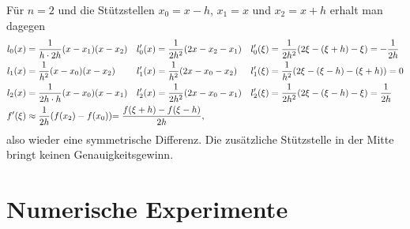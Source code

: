 \begin{refsection}
Für $n=2$ und die Stützstellen $x_0=x-h$, $x_1=x$ und $x_2=x+h$ erhalt man
dagegen
\begin{align*}
l_0(x)
&=
\frac{1}{h\cdot 2h} (x-x_1)(x-x_2)
&
l_0'(x)
&=
\frac{1}{2h^2}(2x-x_2-x_1)
&
l_0'(\xi)
&=
\frac{1}{2h^2}(2\xi -(\xi+h) -\xi)
=
-\frac{1}{2h}
\\
l_1(x)
&=
\frac{1}{h^2} (x-x_0)(x-x_2)
&
l'_1(x)
&=
\frac{1}{h^2} (2x-x_0-x_2)
&
l'_1(\xi)
&=
\frac{1}{h^2}(2\xi-(\xi-h)-(\xi+h)) = 0
\\
l_2(x)
&=
\frac{1}{2h\cdot h} (x-x_0)(x-x_1)
&
l'_2(x)
&=
\frac{1}{2h^2} (2x-x_0-x_1)
&
l'_2(\xi)
&=
\frac{1}{2h^2} (2\xi-(\xi-h)-\xi)
=
\frac{1}{2h}
\\
f'(\xi)
&\approx
\frac{1}{2h}(f(x_2) - f(x_0))
\rlap{$\displaystyle= \frac{f(\xi+h)-f(\xi-h)}{2h},$}
\end{align*}
also wieder eine symmetrische Differenz.
Die zusätzliche Stützstelle in der Mitte bringt keinen Genauigkeitsgewinn.



\section{Numerische Experimente}

\cite{interdiff:numerical-analysis}

\printbibliography[heading=subbibliography]
\end{refsection}
